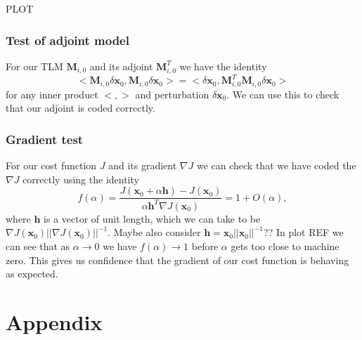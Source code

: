 \documentclass[11pt]{article}
\begin{document}
PLOT

\subsubsection{Test of adjoint model} 

For our TLM $\mathbf{M}_{i,0}$ and its adjoint $\mathbf{M}_{i,0}^{T}$ we have the identity
\begin{equation}
<\mathbf{M}_{i,0}\delta\textbf{x}_0, \mathbf{M}_{i,0}\delta\textbf{x}_0> = <\delta\textbf{x}_0, \mathbf{M}_{i,0}^{T}\mathbf{M}_{i,0}\delta\textbf{x}_0>
\end{equation}
for any inner product $<, >$ and perturbation $\delta \textbf{x}_0$. We can use this to check that our adjoint is coded correctly. 

\subsubsection{Gradient test} \label{sec:testgrad}

For our cost function $J$ and its gradient $\nabla J$ we can check that we have coded the $\nabla J$ correctly using the identity
\begin{equation}
f(\alpha)=\frac{J( \textbf{x}_0 + \alpha \textbf{h}) - J(\textbf{x}_0)}{\alpha \textbf{h}^{T} \nabla J(\textbf{x}_0)} = 1 + O(\alpha),
\end{equation}
where $\textbf{h}$ is a vector of unit length, which we can take to be $\nabla J(\textbf{x}_0)||\nabla J(\textbf{x}_0)||^{-1}$. Maybe also consider $\textbf{h}=\textbf{x}_0||\textbf{x}_0||^{-1}$?? In plot REF we can see that as $\alpha \rightarrow 0$ we have $f(\alpha) \rightarrow 1$ before $\alpha$ gets too close to machine zero. This gives us confidence that the gradient of our cost function is behaving as expected.
{}
%

\section*{Appendix}
\end{document}
